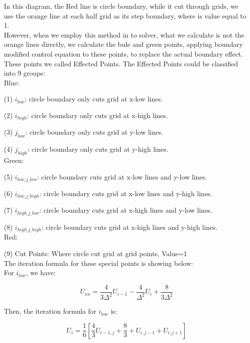 \documentclass[12pt]{article}
\begin{document}
In this diagram, the Red line is circle boundary, while it cut through
grids, we use the orange line at each half grid as its step boundary, 
where is value equal to 1.\\

However, when we employ this method in to solver, what we calculate is 
not the orange lines directly, we calculate the bule and green points,
applying boundary modified control equation to these points, to replace
the actual boundary effect. These points we called Effected Points.
The Effected Points could be classified into 9 groups:\\

Blue:

(1) $i_{low}$: circle boundary only cuts grid at x-low lines.

(2) $i_{high}$: circle boundary only cuts grid at x-high lines.

(3) $j_{low}$: circle boundary only cuts grid at y-low lines.

(4) $j_{high}$: circle boundary only cuts grid at y-high lines.\\


Green:

(5) $i_{low\_j\_low}$: circle boundary cuts grid 
at x-low lines and y-low lines.

(6) $i_{low\_j\_high}$: circle boundary cuts grid 
at x-low lines and y-high lines.

(7) $i_{high\_j\_low}$: circle boundary cuts grid 
at x-high lines and y-low lines.

(8) $i_{high\_j\_high}$: circle boundary cuts grid 
at x-high lines and y-high lines.\\

Red:

(9) Cut Points: Where circle cut grid at grid points, Value=1\\



The iteration formula for these special points is showing below:\\

For $i_{low}$, we have:

\[ U_{xx} = \frac{4}{3\Delta^2} U_{i-1} - \frac{4}{\Delta^2} U_{i} + \frac{8}{3\Delta^2}  \]

Then, the iteration formula for $i_{low}$ is:

\[ U_i = \frac{1}{6} \left[ \frac{4}{3} U_{i-1,j} + \frac{8}{3}+ U_{i,j-1} + U_{i,j+1} \right] \]\\
\end{document}
